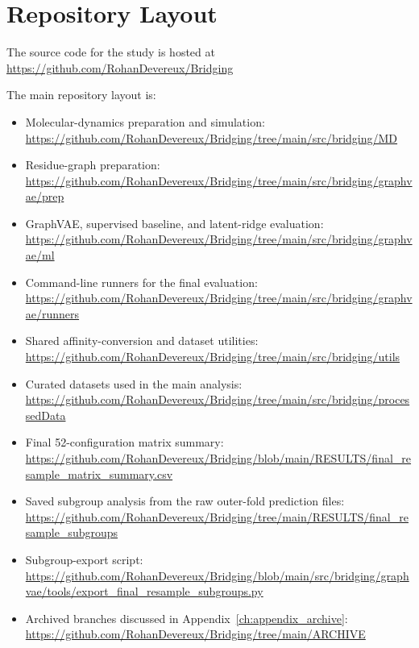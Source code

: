 \chapter{Repository Layout}
\label{ch:code}

The source code for the study is hosted at
\url{https://github.com/RohanDevereux/Bridging}

The main repository layout is:

\begingroup
\small
\sloppy
\begin{itemize}
\item Molecular-dynamics preparation and simulation:\\
\url{https://github.com/RohanDevereux/Bridging/tree/main/src/bridging/MD}
\item Residue-graph preparation:\\
\url{https://github.com/RohanDevereux/Bridging/tree/main/src/bridging/graphvae/prep}
\item GraphVAE, supervised baseline, and latent-ridge evaluation:\\
\url{https://github.com/RohanDevereux/Bridging/tree/main/src/bridging/graphvae/ml}
\item Command-line runners for the final evaluation:\\
\url{https://github.com/RohanDevereux/Bridging/tree/main/src/bridging/graphvae/runners}
\item Shared affinity-conversion and dataset utilities:\\
\url{https://github.com/RohanDevereux/Bridging/tree/main/src/bridging/utils}
\item Curated datasets used in the main analysis:\\
\url{https://github.com/RohanDevereux/Bridging/tree/main/src/bridging/processedData}
\item Final 52-configuration matrix summary:\\
\url{https://github.com/RohanDevereux/Bridging/blob/main/RESULTS/final_resample_matrix_summary.csv}
\item Saved subgroup analysis from the raw outer-fold prediction files:\\
\url{https://github.com/RohanDevereux/Bridging/tree/main/RESULTS/final_resample_subgroups}
\item Subgroup-export script:\\
\url{https://github.com/RohanDevereux/Bridging/blob/main/src/bridging/graphvae/tools/export_final_resample_subgroups.py}
\item Archived branches discussed in Appendix~\ref{ch:appendix_archive}:\\
\url{https://github.com/RohanDevereux/Bridging/tree/main/ARCHIVE}
\end{itemize}
\endgroup
